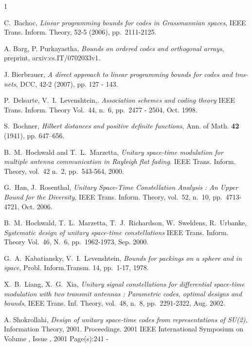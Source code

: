 \documentclass[10pt]{article}
\begin{document}
\begin{thebibliography}{1}


  {C.~Bachoc},
  \emph{Linear programming bounds for codes in Grassmannian spaces},
   IEEE Trans. Inform. Theory, 52-5 (2006), pp.~2111-2125.

 A. Barg, P. Purkayastha,
\emph{ Bounds on ordered codes and
  orthogonal arrays}, preprint, arxiv:cs.IT/0702033v1.


J. Bierbrauer,
\emph{A direct approach to linear programming bounds for codes and tms-nets},
DCC, 42-2 (2007), pp. 127 - 143.


 P.~Delsarte, V.~I.~Levenshtein,.
 \emph{Association schemes and coding theory}
 {IEEE Trans. Inform. Theory}
 Vol.~44, n.~6, pp.~2477 - 2504, Oct. 1998.
 
S.~Bochner,
{\em Hilbert distances and positive definite functions},
Ann. of Math. {\bf 42} (1941), pp. 647--656.




 {B.~M.~Hochwald and T.~L.~Marzetta},
 \emph{Unitary space-time modulation for multiple 
 antenna communication in Rayleigh flat fading.}
 {IEEE Trans. Inform. Theory}, vol.~42 n.~2, pp.~543-564, 2000.

 {G.~Han, J.~Rosenthal},
 \emph{Unitary Space-Time Constellation Analysis :
  An Upper Bound for the Diversity},
 {IEEE Trans. Inform. Theory,}
 vol.~{52}, n.~10, pp.~4713-4721, Oct. {2006}.


B.~M.~Hochwald, T.~L.~Marzetta, T.~J.~Richardson, W.~Sweldens,  R.~Urbanke,
\emph{Systematic design of unitary space-time constellations}
 {IEEE Trans. Inform. Theory}
Vol.~46, N.~6, pp.~1962-1973, Sep. 2000. 


 G.~A.~Kabatiansky, V.~I.~Levenshtein,
 \emph{Bounds for packings on a sphere and in space},
 Probl. Inform.Transm. 14, pp.~1-17, 1978.

   X.~B.~Liang, X.~G.~Xia,
   \emph{Unitary signal constellations for
    differential space-time modulation with two transmit antennas :
    Parametric codes, optimal designs and bounds},
    {IEEE Trans. Inf. Theory}, vol.~48, n.~8, pp.~2291-2322, Aug. 2002.



A. Shokrollahi,
\emph{Design of unitary space-time codes from representations of SU(2)},
Information Theory, 2001. Proceedings. 2001 IEEE International Symposium on
Volume , Issue , 2001 Page(s):241 - 


\end{thebibliography}
\end{document}

